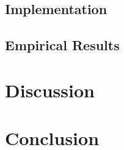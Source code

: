 \documentclass{report}
\begin{document}
%  
  
%   

%    
  

\subsection{Implementation}
\label{sec:type_graph:implementation}
 



\subsection{Empirical Results}
\label{sec:type_graph:result}
 

\section{Discussion}
\label{sec:type_graph:related_work}


\section{Conclusion}
\label{sec:type_graph:conclusion}

\end{document}
